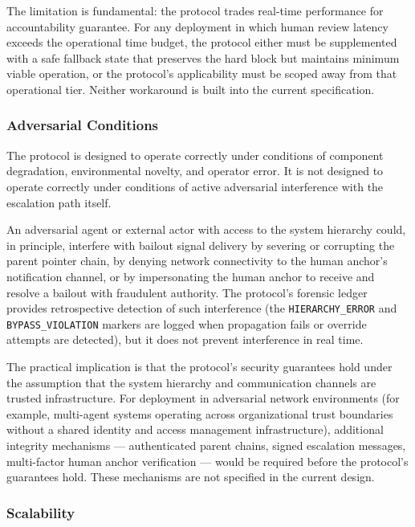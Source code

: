 The limitation is fundamental: the protocol trades real-time performance for accountability guarantee. For any deployment in which human review latency exceeds the operational time budget, the protocol either must be supplemented with a safe fallback state that preserves the hard block but maintains minimum viable operation, or the protocol's applicability must be scoped away from that operational tier. Neither workaround is built into the current specification.

\subsubsection{Adversarial Conditions}\label{sec:adversarial-conditions}

The protocol is designed to operate correctly under conditions of component degradation, environmental novelty, and operator error. It is not designed to operate correctly under conditions of active adversarial interference with the escalation path itself.

An adversarial agent or external actor with access to the system hierarchy could, in principle, interfere with bailout signal delivery by severing or corrupting the parent pointer chain, by denying network connectivity to the human anchor's notification channel, or by impersonating the human anchor to receive and resolve a bailout with fraudulent authority. The protocol's forensic ledger provides retrospective detection of such interference (the \texttt{HIERARCHY\_ERROR} and \texttt{BYPASS\_VIOLATION} markers are logged when propagation fails or override attempts are detected), but it does not prevent interference in real time.

The practical implication is that the protocol's security guarantees hold under the assumption that the system hierarchy and communication channels are trusted infrastructure. For deployment in adversarial network environments (for example, multi-agent systems operating across organizational trust boundaries without a shared identity and access management infrastructure), additional integrity mechanisms --- authenticated parent chains, signed escalation messages, multi-factor human anchor verification --- would be required before the protocol's guarantees hold. These mechanisms are not specified in the current design.

\subsubsection{Scalability}\label{sec:scalability}

